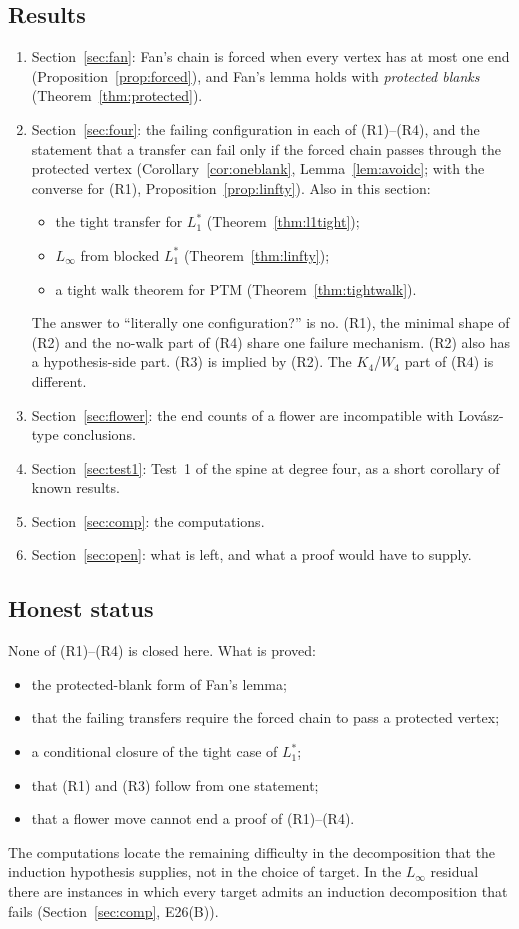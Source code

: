 \documentclass[11pt]{amsart}
\theoremstyle{definition}
\begin{document}
\subsection*{Results}
\begin{enumerate}
\item Section~\ref{sec:fan}: Fan's chain is forced when every vertex has at most one end
(Proposition~\ref{prop:forced}), and Fan's lemma holds with \emph{protected blanks}
(Theorem~\ref{thm:protected}).
\item Section~\ref{sec:four}: the failing configuration in each of (R1)--(R4), and the statement
that a transfer can fail only if the forced chain passes through the protected vertex
(Corollary~\ref{cor:oneblank}, Lemma~\ref{lem:avoidc}; with the converse for (R1),
Proposition~\ref{prop:linfty}). Also in this section:
  \begin{itemize}
  \item the tight transfer for $L_1^*$ (Theorem~\ref{thm:l1tight});
  \item $L_\infty$ from blocked $L_1^*$ (Theorem~\ref{thm:linfty});
  \item a tight walk theorem for PTM (Theorem~\ref{thm:tightwalk}).
  \end{itemize}
The answer to ``literally one configuration?'' is no. (R1), the minimal shape of (R2) and the
no-walk part of (R4) share one failure mechanism. (R2) also has a hypothesis-side part. (R3) is
implied by (R2). The $K_4$/$W_4$ part of (R4) is different.
\item Section~\ref{sec:flower}: the end counts of a flower are incompatible with Lov\'asz-type
conclusions.
\item Section~\ref{sec:test1}: Test~1 of the spine at degree four, as a short corollary of known
results.
\item Section~\ref{sec:comp}: the computations.
\item Section~\ref{sec:open}: what is left, and what a proof would have to supply.
\end{enumerate}

\subsection*{Honest status}
None of (R1)--(R4) is closed here. What is proved:
\begin{itemize}
\item the protected-blank form of Fan's lemma;
\item that the failing transfers require the forced chain to pass a protected vertex;
\item a conditional closure of the tight case of $L_1^*$;
\item that (R1) and (R3) follow from one statement;
\item that a flower move cannot end a proof of (R1)--(R4).
\end{itemize}
The computations locate the remaining difficulty in the decomposition that the induction hypothesis
supplies, not in the choice of target. In the $L_\infty$ residual there are instances in which every
target admits an induction decomposition that fails (Section~\ref{sec:comp}, E26(B)).
\end{document}
